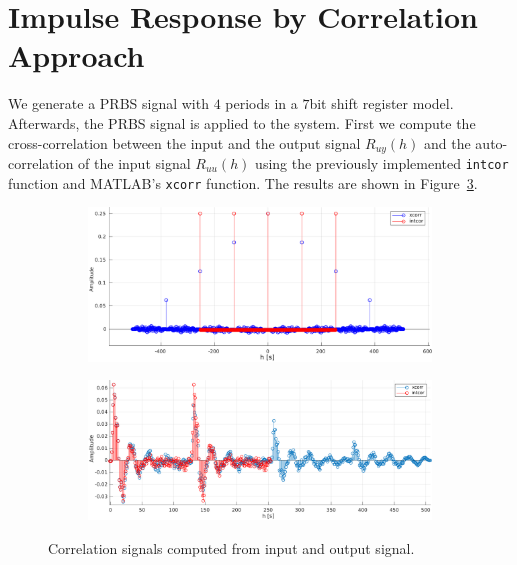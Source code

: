 \documentclass{scrartcl}
\begin{document}
\section{Impulse Response by Correlation Approach}
We generate a PRBS signal with $4$ periods in a $7$bit shift register model.
Afterwards, the PRBS signal is applied to the system.
First we compute the cross-correlation between the input and the output signal $R_{uy}(h)$ and the auto-correlation of the input signal $R_{uu}(h)$ using the previously implemented \texttt{intcor} function and MATLAB's \texttt{xcorr} function. The results are shown in Figure~\ref{fig:cross_correlations}.
\begin{figure}[h]
	\centering
	\begin{subfigure}{0.6\textwidth}
		\includegraphics[width=\textwidth]{figures/ac.pdf}
		\label{fig:cc_ac}
	\end{subfigure}
	\begin{subfigure}{0.6\textwidth}
		\includegraphics[width=\textwidth]{figures/cc.pdf}
		\label{fig:cc_cc}
	\end{subfigure}
	\caption{Correlation signals computed from input and output signal.}\label{fig:cross_correlations}
\end{figure}
\end{document}
